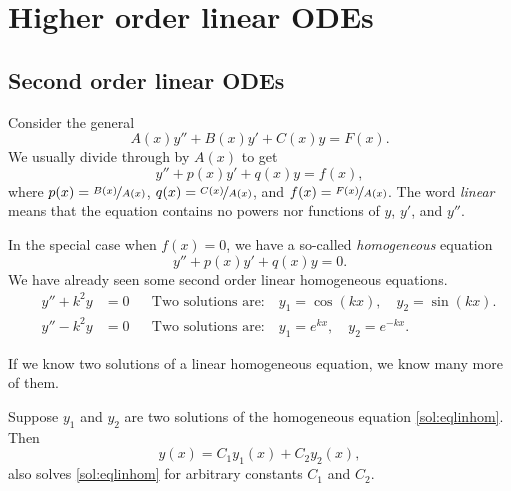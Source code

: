\chapter{Higher order linear ODEs} \label{ho:chapter}


\section{Second order linear ODEs}
\label{solinear:section}


Consider the general
\emph{}
\begin{equation*}
A(x) y'' + B(x)y' + C(x)y = F(x) .
\end{equation*}
We usually divide through by $A(x)$ to get
\begin{equation} \label{sol:eqlin}
y'' + p(x)y' + q(x)y = f(x) ,
\end{equation}
where $p(x) = \nicefrac{B(x)}{A(x)}$, $q(x) = \nicefrac{C(x)}{A(x)}$, and
$f(x) = \nicefrac{F(x)}{A(x)}$.
The word \emph{linear} means that the equation contains no powers nor
functions of $y$, $y'$, and $y''$.

In the special case when $f(x) = 0$, we have a so-called
\emph{homogeneous}
equation
\begin{equation} \label{sol:eqlinhom}
y'' + p(x)y' + q(x)y = 0 .
\end{equation}
We have already seen some second order linear homogeneous equations.
\begin{align*}
\qquad y'' + k^2 y & = 0 &
& \text{Two solutions are:} \quad y_1 = \cos (kx), \quad y_2 = \sin(kx) . \qquad \\
\qquad y'' - k^2 y & = 0 &
& \text{Two solutions are:} \quad y_1 = e^{kx}, \quad y_2 = e^{-kx} . \qquad
\end{align*}

If we know two solutions of a linear homogeneous equation, we know many
more of them.

\begin{theorem}[Superposition]
Suppose $y_1$ and $y_2$ are two solutions of the
homogeneous equation \eqref{sol:eqlinhom}.  Then 
\begin{equation*}
y(x) = C_1 y_1(x) + C_2 y_2(x) ,
\end{equation*}
also solves \eqref{sol:eqlinhom} for arbitrary constants $C_1$ and $C_2$.
\end{theorem}

